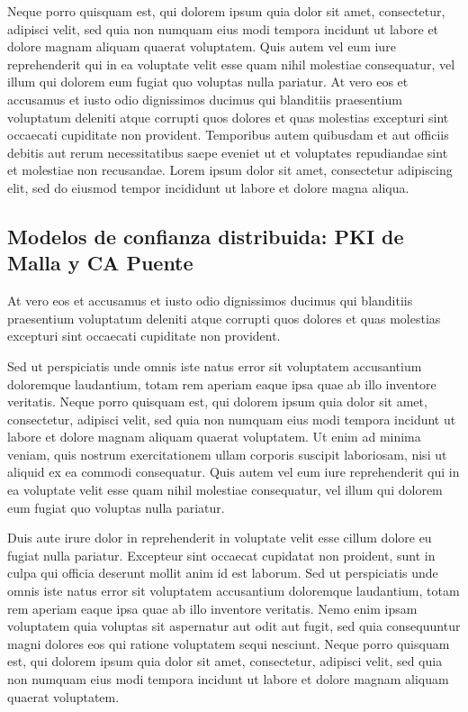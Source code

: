 Neque porro quisquam est, qui dolorem ipsum quia dolor sit amet, consectetur, adipisci velit, sed quia non numquam eius modi tempora incidunt ut labore et dolore magnam aliquam quaerat voluptatem. Quis autem vel eum iure reprehenderit qui in ea voluptate velit esse quam nihil molestiae consequatur, vel illum qui dolorem eum fugiat quo voluptas nulla pariatur. At vero eos et accusamus et iusto odio dignissimos ducimus qui blanditiis praesentium voluptatum deleniti atque corrupti quos dolores et quas molestias excepturi sint occaecati cupiditate non provident. Temporibus autem quibusdam et aut officiis debitis aut rerum necessitatibus saepe eveniet ut et voluptates repudiandae sint et molestiae non recusandae. Lorem ipsum dolor sit amet, consectetur adipiscing elit, sed do eiusmod tempor incididunt ut labore et dolore magna aliqua.

\subsection{Modelos de confianza distribuida: PKI de Malla y CA Puente}

At vero eos et accusamus et iusto odio dignissimos ducimus qui blanditiis praesentium voluptatum deleniti atque corrupti quos dolores et quas molestias excepturi sint occaecati cupiditate non provident.

Sed ut perspiciatis unde omnis iste natus error sit voluptatem accusantium doloremque laudantium, totam rem aperiam eaque ipsa quae ab illo inventore veritatis. Neque porro quisquam est, qui dolorem ipsum quia dolor sit amet, consectetur, adipisci velit, sed quia non numquam eius modi tempora incidunt ut labore et dolore magnam aliquam quaerat voluptatem. Ut enim ad minima veniam, quis nostrum exercitationem ullam corporis suscipit laboriosam, nisi ut aliquid ex ea commodi consequatur. Quis autem vel eum iure reprehenderit qui in ea voluptate velit esse quam nihil molestiae consequatur, vel illum qui dolorem eum fugiat quo voluptas nulla pariatur.

Duis aute irure dolor in reprehenderit in voluptate velit esse cillum dolore eu fugiat nulla pariatur. Excepteur sint occaecat cupidatat non proident, sunt in culpa qui officia deserunt mollit anim id est laborum. Sed ut perspiciatis unde omnis iste natus error sit voluptatem accusantium doloremque laudantium, totam rem aperiam eaque ipsa quae ab illo inventore veritatis. Nemo enim ipsam voluptatem quia voluptas sit aspernatur aut odit aut fugit, sed quia consequuntur magni dolores eos qui ratione voluptatem sequi nesciunt. Neque porro quisquam est, qui dolorem ipsum quia dolor sit amet, consectetur, adipisci velit, sed quia non numquam eius modi tempora incidunt ut labore et dolore magnam aliquam quaerat voluptatem.

